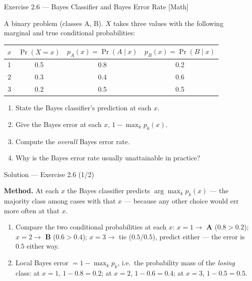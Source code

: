\documentclass[aspectratio=169,11pt]{beamer}
\begin{document}
\begin{frame}{Exercise 2.6 --- Bayes Classifier and Bayes Error Rate [Math]}
\begin{exercise}
A binary problem (classes A, B). $X$ takes three values with the
following marginal and true conditional probabilities:
\begin{center}\footnotesize
\begin{tabular}{cccc}
\toprule
$x$ & $\Pr(X=x)$ & $p_A(x)=\Pr(A\mid x)$ & $p_B(x)=\Pr(B\mid x)$ \\
\midrule
1 & 0.5 & 0.8 & 0.2 \\
2 & 0.3 & 0.4 & 0.6 \\
3 & 0.2 & 0.5 & 0.5 \\
\bottomrule
\end{tabular}
\end{center}
\begin{enumerate}
  \item State the Bayes classifier's prediction at each $x$.
  \item Give the Bayes error at each $x$, $1-\max_k p_k(x)$.
  \item Compute the \emph{overall} Bayes error rate.
  \item Why is the Bayes error rate usually unattainable in practice?
\end{enumerate}
\end{exercise}
\end{frame}

\begin{frame}{Solution --- Exercise 2.6 (1/2)}
\begin{solutionbox}
\textbf{Method.} At each $x$ the Bayes classifier predicts
$\arg\max_k p_k(x)$ --- the majority class among cases with that $x$
--- because any other choice would err more often at that $x$.
\begin{enumerate}
  \item Compare the two conditional probabilities at each $x$:
        $x=1\to$ \textbf{A} ($0.8>0.2$); $x=2\to$ \textbf{B}
        ($0.6>0.4$); $x=3\to$ tie ($0.5/0.5$), predict either --- the
        error is $0.5$ either way.
  \item Local Bayes error $=1-\max_k p_k$, i.e.\ the probability mass
        of the \emph{losing} class: at $x=1$, $1-0.8=0.2$; at
        $x=2$, $1-0.6=0.4$; at $x=3$, $1-0.5=0.5$.
\end{enumerate}
\end{solutionbox}
\end{frame}
\end{document}
